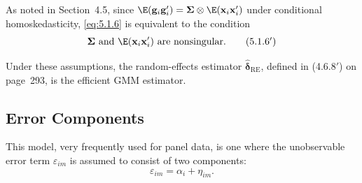 
As noted in Section~4.5, since
$\E(\mathbf{g}_i\mathbf{g}_i') = \boldsymbol{\Sigma} \otimes \E(\mathbf{x}_i\mathbf{x}_i')$
under conditional homoskedasticity, \eqref{eq:5.1.6} is equivalent to the condition
\begin{equation}
  \boldsymbol{\Sigma} \text{ and } \E(\mathbf{x}_i\mathbf{x}_i')
  \text{ are nonsingular.}
  \label{eq:5.1.6p} \tag{5.1.6$'$}
\end{equation}

Under these assumptions, the random-effects estimator $\hat{\boldsymbol{\delta}}_{\text{RE}}$,
defined in (4.6.8$'$) on page~293, is the efficient GMM estimator.

\subsection*{Error Components}

This model, very frequently used for panel data, is one where the unobservable
error term $\varepsilon_{im}$ is assumed to consist of two components:
\begin{equation}
  \varepsilon_{im} = \alpha_i + \eta_{im}.
  \label{eq:5.1.7} \tag{5.1.7}
\end{equation}

